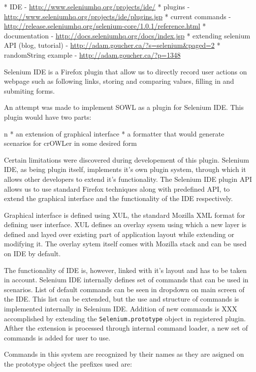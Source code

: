 \begitems
  * IDE - \url{http://www.seleniumhq.org/projects/ide/}
  * plugins - \url{http://www.seleniumhq.org/projects/ide/plugins.jsp}
  * current commands - \url{http://release.seleniumhq.org/selenium-core/1.0.1/reference.html}
  * documentation - \url{http://docs.seleniumhq.org/docs/index.jsp}
  * extending selenium API (blog, tutorial) - \url{http://adam.goucher.ca/?s=selenium&paged=2}
  \begitems
    * randomString example - \url{http://adam.goucher.ca/?p=1348}
  \enditems
\enditems

Selenium IDE is a Firefox plugin that allow us to directly record user actions
on webpage such as following links, storing and comparing values, filling in
and submiting forms. 

An attempt was made to implement SOWL as a plugin for Selenium IDE. This plugin
would have two parts: 

\begitems \style n
  * an extension of graphical interface
  * a formatter that would generate scenarios for crOWLer in some desired form
\enditems

Certain limitations were discovered during developement of this plugin.
Selenium IDE, as being plugin itself, implements it's own plugin system,
through which it allows other developers to extend it's functionality. The
Selenium IDE plugin API allows us to use standard Firefox techniques along with
predefined API, to extend the graphical interface and the functionality of the
IDE respectively. 

Graphical interface is defined using XUL, the standard Mozilla XML format for
defining user interface. XUL defines an overlay sysem using which a new layer
is defined and layed over existing part of application layout while extending
or modifying it. The overlay sytem itself comes with Mozilla stack and can be
used on IDE by default.

The functionality of IDE is, however, linked with it's layout and has to be
taken in account. Selenium IDE internally defines set of commands that can be
used in scenarios. List of default commands can be seen in dropdown on main
screen of the IDE. This list can be extended, but the use and structure of
commands is implemented internally in Selenium IDE. Addition of new commands is
XXX accomplished  by extending the {\tt Selenium.prototype} object in registered
plugin. Afther the extension is processed through internal command loader, a
new set of commands is added for user to use. 

Commands in this system are recognized by their names as they are asigned on
the prototype object the prefixes used are: 

